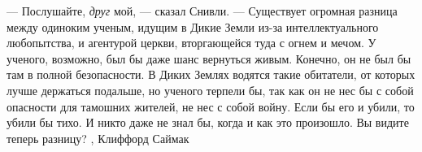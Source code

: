 — Послушайте, \emph{друг} мой, — сказал Снивли. — Существует огромная разница между
одиноким ученым, идущим в Дикие Земли из-за интеллектуального любопытства, и
агентурой церкви, вторгающейся туда с огнем и мечом. У ученого, возможно, был
бы даже шанс вернуться живым. Конечно, он не был бы там в полной безопасности.
В Диких Землях водятся такие обитатели, от которых лучше держаться подальше, но
ученого терпели бы, так как он не нес бы с собой опасности для тамошних
жителей, не нес с собой войну. Если бы его и убили, то убили бы тихо. И никто
даже не знал бы, когда и как это произошло. Вы видите теперь разницу?
, Клиффорд Саймак
